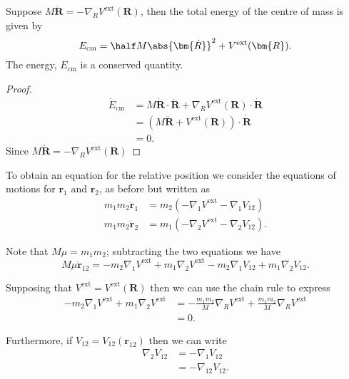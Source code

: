 \documentclass[12pt, a4paper]{article}
\begin{document}
\begin{mdthm}
    Suppose \(M\bm{\ddot{R}}=  - \nabla_R V^{\text{ext}}(\bm{R})\), then the total energy of the centre of mass is given by 
    \[E_{\text{cm}} = \half M \abs{\bm{\dot{R}}}^2 +V^{\text{ext}}(\bm{R}).\]
    The energy, \(E_{\text{cm}}\) is a conserved quantity.
\end{mdthm}

\begin{proof}
    \[\begin{aligned}
        \dot{E}_{\text{cm}} &= M\bm{\dot{R} \cdot \bm{\ddot{R}}} +\nabla_R V^{\text{ext}}(\bm{R}) \cdot \bm{\dot{R}} \\ 
        &= \left( M\bm{\ddot{R}} +V^{\text{ext}}(\bm{R}) \right) \cdot \bm{\dot{R}} \\
        &= 0.
    \end{aligned}\]
    Since \(M\bm{\ddot{R}} =- \nabla_R V^{\text{ext}}(\bm{R})\)
\end{proof}

To obtain an equation for the relative position we consider the equations of motions for \(\bm{r}_1\) and \(\bm{r}_2\), as before but written as 
\[\begin{aligned}
    m_1 m_2 \bm{\ddot{r}}_1 &= m_2 \left( -\nabla_1 V^{\text{ext}} - \nabla_1 V_{12} \right) \\
    m_1 m_2 \bm{\ddot{r}}_2 &= m_1 \left( -\nabla_2 V^{\text{ext}} - \nabla_2 V_{12} \right).
\end{aligned}\]

Note that \(M\mu = m_1 m_2\); subtracting the two equations we have 
\[M\mu \bm{\ddot{r}}_{12} = -m_2 \nabla_1 V^{\text{ext}} + m_1 \nabla_2 V^{\text{ext}} -m_2 \nabla_1 V_{12} +m_1 \nabla_2 V_{12}.\]

Supposing that \(V^{\text{ext}} = V^{\text{ext}}(\bm{R})\) then we can use the chain rule to express 
\[\begin{aligned}
    -m_2 \nabla_1 V^{\text{ext}} + m_1 \nabla_2 V^{\text{ext}} &= - \frac{m_1 m_2}{M} \nabla_R V^{\text{ext}} + \frac{m_1 m_2}{M} \nabla_R V^{\text{ext}} \\
    &=0.
\end{aligned}\]

Furthermore, if \(V_{12} = V_{12}(\bm{r}_{12})\) then we can write 
\[\begin{aligned}
    \nabla_2 V_{12} &= -\nabla_1 V_{12} \\
    &= -\nabla_{12} V_{12}.
\end{aligned}\]
\end{document}
